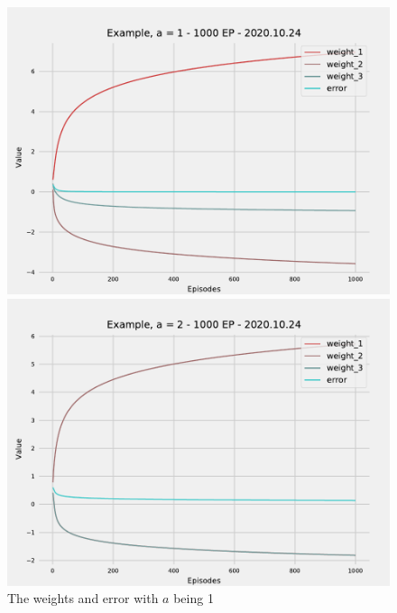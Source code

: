 \documentclass[12pt]{article}
\begin{document}
\begin{figure}
  \vspace{-20pt}
  \begin{center}
\includegraphics[scale=0.4]{pictures/fig.Example, a = 1 - 1000 EP - 2020.10.24.pdf}
\end{center}
  \vspace{-20pt}
  \caption{The weights and error with $a$ being 1}
  \label{a1}
    \vspace{-10pt}
  \begin{center}
\includegraphics[scale=0.4]{pictures/fig.Example, a = 2 - 1000 EP - 2020.10.24.pdf}
\end{center}
  \vspace{-20pt}

\end{figure}
\end{document}
